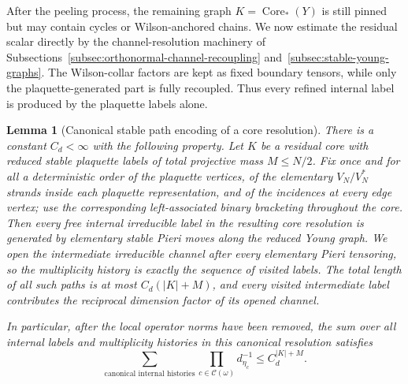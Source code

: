 \documentclass[11pt,a4paper,reqno]{amsart}
\newtheorem{lemma}[theorem]{Lemma}
\theoremstyle{definition}
\theoremstyle{remark}
\begin{document}
After the peeling process, the remaining graph $K=\operatorname{Core}_*(Y)$ is still pinned but may contain cycles or Wilson-anchored chains.  We now estimate the residual scalar directly by the channel-resolution machinery of Subsections~\ref{subsec:orthonormal-channel-recoupling} and~\ref{subsec:stable-young-graphs}.  The Wilson-collar factors are kept as fixed boundary tensors, while only the plaquette-generated part is fully recoupled.  Thus every refined internal label is produced by the plaquette labels alone.

\begin{lemma}[Canonical stable path encoding of a core resolution]\label{lem:core-path-encoding}
There is a constant $C_d<\infty$ with the following property.  Let $K$ be a residual core with reduced stable plaquette labels of total projective mass $M\le N/2$.  Fix once and for all a deterministic order of the plaquette vertices, of the elementary $V_N/V_N^*$ strands inside each plaquette representation, and of the incidences at every edge vertex; use the corresponding left-associated binary bracketing throughout the core.  Then every free internal irreducible label in the resulting core resolution is generated by elementary stable Pieri moves along the reduced Young graph.  We open the intermediate irreducible channel after every elementary Pieri tensoring, so the multiplicity history is exactly the sequence of visited labels.  The total length of all such paths is at most $C_d(|K|+M)$, and every visited intermediate label contributes the reciprocal dimension factor of its opened channel.

In particular, after the local operator norms have been removed, the sum over \emph{all} internal labels and multiplicity histories in this canonical resolution satisfies
\begin{equation}\label{eq:canonical-core-path-sum}
\sum_{\text{canonical internal histories}}
\prod_{c\in\mathcal C(\omega)}d_{\eta_c}^{-1}
\le C_d^{|K|+M}.
\end{equation}
\end{lemma}
\end{document}
